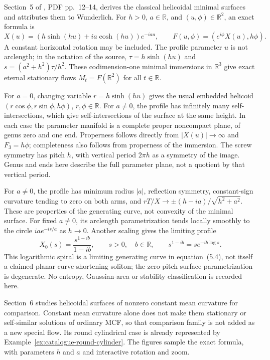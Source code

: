 \begin{example}\label{ex:catalogue-halldorsson-minimal-helicoids}
Section~5 of \cite{CatHalldorsson2013}, PDF pp.~12--14, derives the classical
helicoidal minimal surfaces and attributes them to Wunderlich.
For $h>0$, $a\in\mathbb R$, and $(u,\phi)\in\mathbb R^2$, an exact formula is
\[
 X(u)=(h\sinh(hu)+ia\cosh(hu))e^{-iau},\qquad
 F(u,\phi)=(e^{i\phi}X(u),h\phi).
\]
A constant horizontal rotation may be included. The profile parameter $u$
is not arclength; in the notation of the source,
$\tau=h\sinh(hu)$ and $s=(a^2+h^2)\tau/h^2$.
These codimension-one minimal immersions in $\mathbb R^3$ give exact eternal
stationary flows $M_t=F(\mathbb R^2)$ for all $t\in\mathbb R$.

For $a=0$, changing variable $r=h\sinh(hu)$ gives the usual embedded
helicoid $(r\cos\phi,r\sin\phi,h\phi)$, $r,\phi\in\mathbb R$.
For $a\ne0$, the profile has infinitely many self-intersections, which give
self-intersections of the surface at the same height. In each case the
parameter manifold is a complete proper noncompact plane, of genus zero
and one end. Properness follows directly from $|X(u)|\to\infty$ and
$F_3=h\phi$; completeness also follows from properness of the immersion.
The screw symmetry has pitch $h$, with vertical period $2\pi h$ as a
symmetry of the image. Genus and ends here describe the full parameter
plane, not a quotient by that vertical period.

For $a\ne0$, the profile has minimum radius $|a|$, reflection symmetry,
constant-sign curvature tending to zero on both arms, and
$rT/X\to\pm(h-ia)/\sqrt{h^2+a^2}$. These are properties of the generating
curve, not convexity of the minimal surface. For fixed $a\ne0$, its
arclength parametrization tends locally smoothly to the circle
$ia e^{-is/a}$ as $h\to0$. Another scaling gives the limiting profile
\[
 X_0(s)=\frac{s^{1-ib}}{1-ib},\qquad s>0,\quad b\in\mathbb R,
 \qquad s^{1-ib}=s e^{-ib\log s}.
\]
This logarithmic spiral is a limiting generating curve in equation~(5.4),
not itself a claimed planar curve-shortening soliton; the zero-pitch
surface parametrization is degenerate. No entropy, Gaussian-area or
stability classification is recorded here.

Section~6 studies helicoidal surfaces of nonzero constant mean curvature
for comparison. Constant mean curvature alone does not make them
stationary or self-similar solutions of ordinary MCF, so that comparison
family is not added as a new special flow. Its round cylindrical case is
already represented by Example~\ref{ex:catalogue-round-cylinder}.
The figures sample the exact formula, with parameters $h$ and $a$ and
interactive rotation and zoom.
\end{example}
